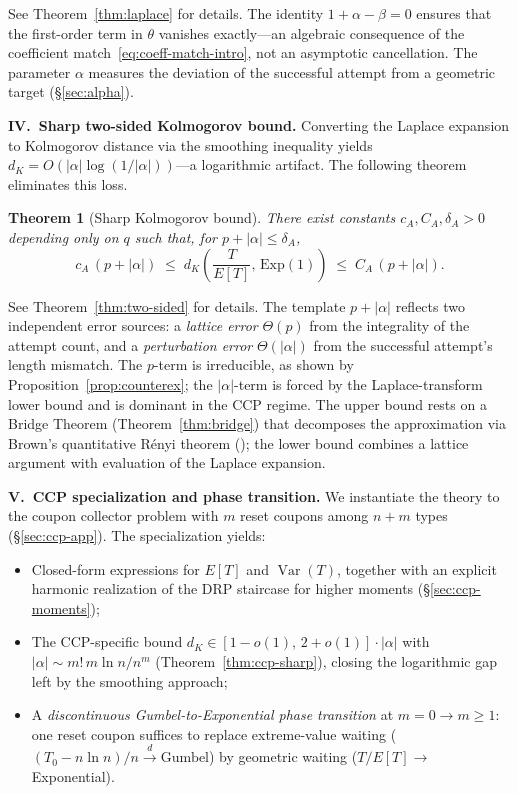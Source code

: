 \documentclass[11pt]{article}
\theoremstyle{plain}
\newtheorem{theorem}{Theorem}[section]
\theoremstyle{definition}
\theoremstyle{remark}
\begin{document}
See Theorem~\ref{thm:laplace} for details. The identity $1 + \alpha - \beta = 0$ ensures that the first-order term in $\theta$ vanishes exactly---an algebraic consequence of the coefficient match~\eqref{eq:coeff-match-intro}, not an asymptotic cancellation.  The parameter $\alpha$ measures the deviation of the successful attempt from a geometric target (\S\ref{sec:alpha}).

\medskip
\noindent\textbf{IV.\ Sharp two-sided Kolmogorov bound.}
Converting the Laplace expansion to Kolmogorov distance via the smoothing inequality yields $d_K = O(|\alpha| \log(1/|\alpha|))$---a logarithmic artifact.  The following theorem eliminates this loss.

\begin{theorem}[Sharp Kolmogorov bound]\label{thm:D}
There exist constants $c_A, C_A, \delta_A > 0$ depending only on $q$ such that, for $p + |\alpha| \leq \delta_A$,
\[
  c_A\,(p + |\alpha|) \;\leq\; d_K\!\left(\frac{T}{E[T]},\, \mathrm{Exp}(1)\right) \;\leq\; C_A\,(p + |\alpha|).
\]
\end{theorem}

See Theorem~\ref{thm:two-sided} for details. The template $p + |\alpha|$ reflects two independent error sources: a \emph{lattice error} $\Theta(p)$ from the integrality of the attempt count, and a \emph{perturbation error} $\Theta(|\alpha|)$ from the successful attempt's length mismatch.  The \(p\)-term is irreducible, as shown by Proposition~\ref{prop:counterex}; the
\(|\alpha|\)-term is forced by the Laplace-transform lower bound and is dominant in the CCP regime.  The upper bound rests on a Bridge Theorem (Theorem~\ref{thm:bridge}) that decomposes the approximation via Brown's quantitative R\'enyi theorem (\cite{Brown90}); the lower bound combines a lattice argument with evaluation of the Laplace expansion.

\medskip
\noindent\textbf{V.\ CCP specialization and phase transition.}
We instantiate the theory to the coupon collector problem with $m$ reset coupons among $n+m$ types (\S\ref{sec:ccp-app}).  The specialization yields:
\begin{itemize}
\item Closed-form expressions for \(E[T]\) and \(\operatorname{Var}(T)\), together with an explicit harmonic realization of the DRP staircase for higher moments (\S\ref{sec:ccp-moments});
\item The CCP-specific bound $d_K \in [1-o(1),\, 2+o(1)] \cdot |\alpha|$ with $|\alpha| \sim m!\,m\ln n / n^m$ (Theorem~\ref{thm:ccp-sharp}), closing the logarithmic gap left by the smoothing approach;
\item A \emph{discontinuous Gumbel-to-Exponential phase transition} at $m = 0 \to m \geq 1$: one reset coupon suffices to replace extreme-value waiting ($(T_0 - n\ln n)/n \xrightarrow{d} \text{Gumbel}$) by geometric waiting ($T/E[T] \to$ Exponential).
\end{itemize}
\end{document}
